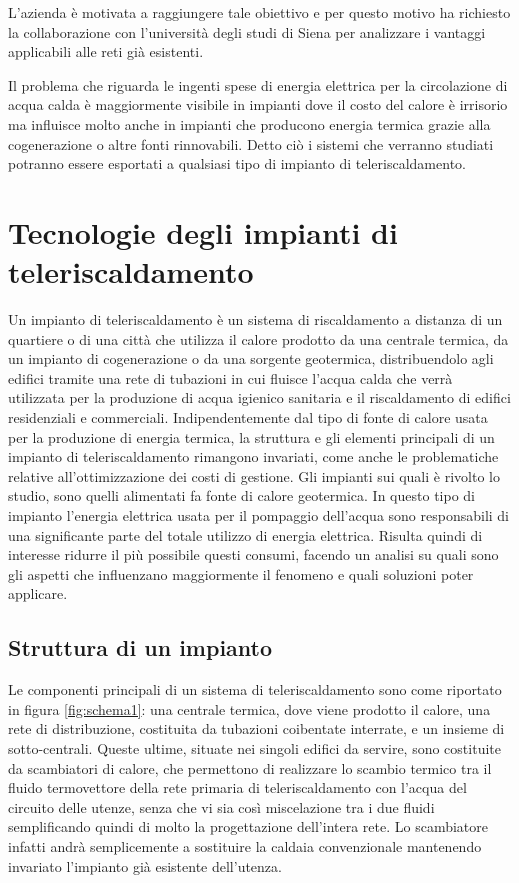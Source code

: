 \documentclass[laurea,oneside,11pt]{USiena_tesiLM}
\begin{document}
L'azienda è motivata a raggiungere tale obiettivo e per questo motivo ha richiesto la collaborazione con l'università degli studi di Siena per analizzare i vantaggi applicabili alle reti già esistenti.

Il problema che riguarda le ingenti spese di energia elettrica per la circolazione di acqua calda è maggiormente visibile in impianti dove il costo del calore è irrisorio ma influisce molto anche in impianti che producono energia termica grazie alla cogenerazione o altre fonti rinnovabili. Detto ciò i sistemi che verranno studiati potranno essere esportati a qualsiasi tipo di impianto di teleriscaldamento.


\chapter{Tecnologie degli impianti di teleriscaldamento}
Un impianto di teleriscaldamento è un  sistema di riscaldamento a distanza di un quartiere o di una città 
che utilizza il calore prodotto da una centrale termica, da un impianto di cogenerazione o da una sorgente geotermica, distribuendolo agli edifici tramite una rete di tubazioni in cui fluisce l'acqua calda che verrà utilizzata per la produzione di acqua igienico sanitaria e il riscaldamento di edifici residenziali e commerciali. Indipendentemente dal tipo di fonte di calore usata per la produzione di energia termica, la struttura e gli elementi principali di un impianto di teleriscaldamento rimangono invariati, come anche le problematiche relative all'ottimizzazione dei costi di gestione. Gli impianti sui quali è rivolto lo studio, sono quelli alimentati fa fonte di calore geotermica. In questo tipo di impianto l'energia elettrica usata per il pompaggio dell'acqua sono responsabili di una significante parte del totale utilizzo di energia elettrica. Risulta quindi di interesse ridurre il più possibile questi consumi, facendo un analisi su quali sono gli aspetti che influenzano maggiormente il fenomeno e quali soluzioni poter applicare. 

\section{Struttura di un impianto}
Le componenti principali di un sistema di teleriscaldamento sono come riportato in figura \ref{fig:schema1}: una centrale termica, dove viene prodotto il calore, una rete di distribuzione, costituita da tubazioni 
coibentate interrate, e un insieme di sotto-centrali. Queste ultime, situate nei singoli 
edifici da servire, sono costituite da scambiatori di calore, che permettono di realizzare 
lo scambio termico tra il fluido termovettore  della rete primaria di teleriscaldamento con l'acqua del circuito delle utenze, senza che vi sia così miscelazione tra i due fluidi semplificando quindi di molto la progettazione dell'intera rete. Lo scambiatore infatti andrà semplicemente a sostituire la  caldaia convenzionale mantenendo invariato l'impianto già esistente dell'utenza.
\end{document}
